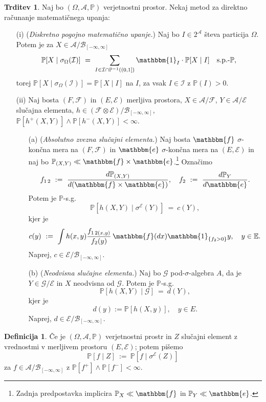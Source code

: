 \documentclass[11pt]{article}
\renewcommand{\P}{\mathbb{P}}
\newcommand{\E}{\mathbb{E}}
\newcommand{\A}{\mathcal{A}}
\newcommand{\F}{\mathcal{F}}
\newcommand{\G}{\mathcal{G}}
\newcommand{\I}{\mathcal{I}}
\newcommand{\B}{\mathscr{B}}
\newcommand{\EE}{\mathcal{E}}
\newcommand{\set}[1]{\{#1\}}
\newcommand{\1}{\mathbbm{1}}
\newcommand{\e}{\mathbbm{e}}
\newcommand{\f}{\mathbbm{f}}
\newcommand{\rr}{[-\infty,\infty]}
\theoremstyle{definition}
\newtheorem{definicija}{Definicija}[section]
\theoremstyle{definition}
\newtheorem{trditev}{Trditev}[section]
\theoremstyle{definition}
\theoremstyle{definition}
\begin{document}
\begin{trditev}

Naj bo $(\Omega, \A, \P)$ verjetnostni prostor. Nekaj metod za direktno računanje matematičnega upanja:
\begin{enumerate}

\item[(i)] (\textit{Diskretno pogojno matematično upanje.}) Naj bo $I \in 2^\A$ števa particija $\Omega$. Potem je za $X \in \A/\B_{\rr}$
$$\P[X \mid \sigma_\Omega(\I)] ~=~ \sum_{I \in \I \cap \P^{-1}((0,1])} \1_I \cdot \P[X \mid I] \quad \text{s.p.-}\P,$$
torej $\P[X \mid \sigma_\Omega(\I)] = \P[X \mid I]$ na $I$, za vsak $I \in \I$ z $\P(I)>0$.

\item[(ii)] Naj bosta $(F,\F)$ in $(E,\EE)$ merljiva prostora, $X \in \A/\F$, $Y \in \A/\EE$ slučajna elementa, $h \in (\F\otimes\EE)/\B_{\rr}$, \hbox{$\P[h^+(X,Y)]\wedge\P[h^-(X,Y)]<\infty$.}
\begin{itemize}
	\item[(a)] (\textit{Absolutno zvezna slučajni elementa.}) Naj bosta $\f$ $\sigma$-končna mera na $(F,\F)$ in $\e$ $\sigma$-končna mera na $(E,\EE)$ in naj bo $\P_{(X,Y)} \ll \f \times \e$.\footnote{Zadnja predpostavka implicira $\P_X \ll \f$ in $\P_Y \ll \e$.} Označimo
	$$f_{1\,2} ~:=~ \frac{d\P_{(X,Y)}}{d(\f\times\e)}, \quad f_2 ~:=~ \frac{d\P_Y}{d\e}.$$ 
	Potem je $\P$-s.g.
	$$\P[h(X,Y) \mid \sigma^{\EE}(Y)] ~=~ c(Y),$$
	kjer je 
	$$c(y) ~:=~ \int h(x,y) \frac{f_{1\,2(x,y)}}{f_2(y)}\,\f(dx)\1_{\set{f_2>0}}y, \quad y \in \E.$$
	Naprej, $c \in \EE/\B_{\rr}$.
	\item[(b)] (\textit{Neodvisna slučajne elementa.}) Naj bo $\G$ pod-$\sigma$-algebra $A$, da je $Y \in \G/\EE$ in $X$ neodvisna od $\G$. Potem je $\P$-s.g.
	$$\P[h(X,Y) \mid \G] ~=~ d(Y),$$
	kjer je 
	$$d(y) := \P[h(X,y)], \quad y \in E.$$
	Naprej, $d \in \EE/\B_{\rr}$.
\end{itemize} 

\end{enumerate}

\end{trditev}
\vspace{0.5cm}

\begin{definicija}

Če je $(\Omega, \A, \P)$ verjetnostni prostr in $Z$ slučajni element z vrednostmi v merljivem prostoru $(E,\EE)$; potem pišemo
$$\P[f \mid Z] ~:=~ \P[f \mid \sigma^\EE(Z)]$$
za $f \in \A/\B_{\rr}$ z $\P[f^+]\wedge\P[f^-]<\infty$.

\end{definicija}
\vspace{0.5cm}
\end{document}
